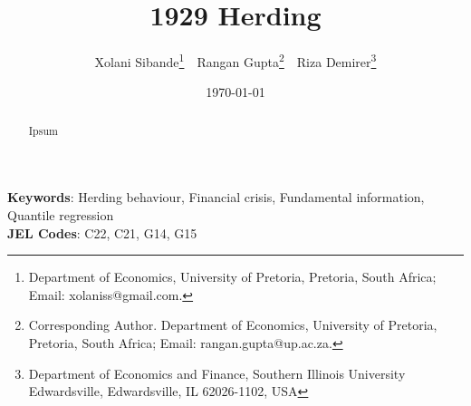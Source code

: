
\title{1929 Herding}


\author { Xolani Sibande\footnote{Department of Economics, University of Pretoria, Pretoria, South Africa; Email: xolaniss@gmail.com.} \,\, 
Rangan Gupta\footnote{Corresponding Author. Department of Economics, University of Pretoria, Pretoria, South Africa; Email: rangan.gupta@up.ac.za.} \,\,
Riza Demirer\footnote{Department of Economics and Finance, Southern Illinois University Edwardsville, Edwardsville, IL 62026-1102, USA}}
\date{\today}
\maketitle

\begin{abstract}
Ipsum

\end{abstract}

\noindent\textbf{Keywords}: Herding behaviour, Financial crisis, Fundamental information, Quantile regression   \\
\textbf{JEL Codes}: C22, C21, G14, G15
\newpage